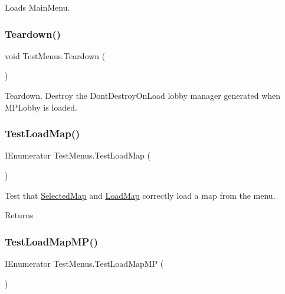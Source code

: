 Loads Main\+Menu. 

\mbox{\label{class_test_menus_a619b64f806de65caed364db4c48f80fd}} 
\subsubsection{\texorpdfstring{Teardown()}{Teardown()}}
{\footnotesize\ttfamily void Test\+Menus.\+Teardown (\begin{DoxyParamCaption}{ }\end{DoxyParamCaption})}



Teardown. Destroy the Dont\+Destroy\+On\+Load lobby manager generated when M\+P\+Lobby is loaded. 

\mbox{\label{class_test_menus_a3066743dee815e1898963e78757bcb72}} 
\subsubsection{\texorpdfstring{Test\+Load\+Map()}{TestLoadMap()}}
{\footnotesize\ttfamily I\+Enumerator Test\+Menus.\+Test\+Load\+Map (\begin{DoxyParamCaption}{ }\end{DoxyParamCaption})}



Test that \hyperlink{class_selected_map}{Selected\+Map} and \hyperlink{class_load_map}{Load\+Map} correctly load a map from the menu. 

\begin{DoxyReturn}{Returns}

\end{DoxyReturn}
\mbox{\label{class_test_menus_a22cbc4a62c604855de0d1bba77bf8d69}} 
\subsubsection{\texorpdfstring{Test\+Load\+Map\+M\+P()}{TestLoadMapMP()}}
{\footnotesize\ttfamily I\+Enumerator Test\+Menus.\+Test\+Load\+Map\+MP (\begin{DoxyParamCaption}{ }\end{DoxyParamCaption})}



